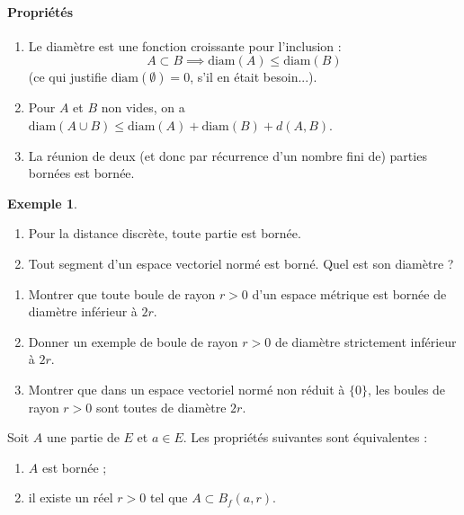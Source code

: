 \documentclass[french]{article}
\theoremstyle{plain}
\theoremstyle{definition}
\newtheorem*{ex}{Exemple}
\theoremstyle{remark}
\begin{document}
\paragraph{Propriétés}
\begin{enumerate}
	\item Le diamètre est une fonction croissante pour l'inclusion : $$A\subset B\implies\text{diam}(A)\leqslant\text{diam}(B)$$
	(ce qui justifie $\text{diam}(\emptyset)=0$, s'il en était besoin...).
	\item Pour $A$ et $B$ non vides, on a $\text{diam}(A\cup B)\leqslant\text{diam}(A)+\text{diam}(B)+d(A,B)$.
	\item La réunion de deux (et donc par récurrence d'un nombre fini de) parties bornées est bornée.
\end{enumerate}

\begin{ex}
	\begin{enumerate}
		\item Pour la distance discrète, toute partie est bornée.
		\item Tout segment d'un espace vectoriel normé est borné. Quel est son diamètre ?
	\end{enumerate}
\end{ex}

\begin{exo}
	\begin{enumerate}
		\item Montrer que toute boule de rayon $r>0$ d'un espace métrique est bornée de diamètre inférieur à $2r$.
		\item Donner un exemple de boule de rayon $r>0$ de diamètre strictement inférieur à $2r$.
		\item Montrer que dans un espace vectoriel normé non réduit à $\{0\}$, les boules de rayon $r>0$ sont toutes de diamètre $2r$.
	\end{enumerate}
\end{exo}

\begin{prop}%
	Soit $A$ une partie de $E$ et $a\in E$. Les propriétés suivantes sont équivalentes :
	\begin{enumerate}[label=(\roman*)]
		\item $A$ est bornée ;
		\item il existe un réel $r>0$ tel que $A\subset B_f(a,r)$.
	\end{enumerate}
\end{prop}
\end{document}
